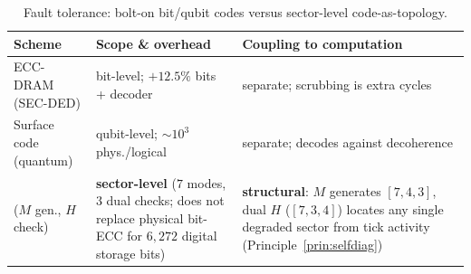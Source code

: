 \begin{table}[H]
\centering\small
\caption{Fault tolerance: bolt-on bit/qubit codes versus sector-level code-as-topology.}
\label{tab:ecc}
\begin{tabular}{@{}p{3.6cm}p{3.4cm}p{4.7cm}@{}}
\toprule
\textbf{Scheme} & \textbf{Scope \& overhead} & \textbf{Coupling to computation} \\
\midrule
ECC-DRAM (SEC-DED) & bit-level; $+12.5\%$ bits + decoder & separate; scrubbing is extra cycles \\
Surface code (quantum) & qubit-level; $\sim\!10^3$ phys./logical & separate; decodes against decoherence \\
\TALOS{} ($M$ gen., $H$ check) & \textbf{sector-level} ($7$ modes, $3$ dual checks; does not replace physical bit-ECC for $6{,}272$ digital storage bits) & \textbf{structural}: $M$ generates $[7,4,3]$, dual $H$ ($[7,3,4]$) locates any single degraded sector from tick activity (Principle~\ref{prin:selfdiag}) \\
\bottomrule
\end{tabular}
\end{table}

